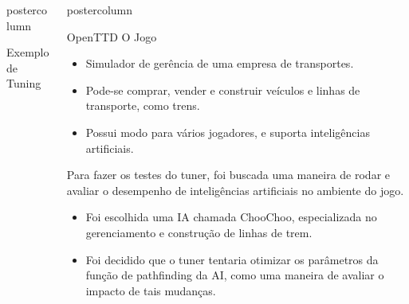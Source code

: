 \documentclass[final]{beamer}
\newlength{\columnheight}
\begin{document}
\begin{frame}
\begin{columns}
\begin{column}{.5\textwidth}
\begin{beamercolorbox}[center,wd=\textwidth]{postercolumn}
\begin{minipage}[T]{.95\textwidth}
{\begin{block}{Exemplo de Tuning}
            	\vspace*{0.2cm}
            \end{block}
          }
        \end{minipage}
      \end{beamercolorbox}
    \end{column}

    \begin{column}{.5\textwidth}
      \begin{beamercolorbox}[center,wd=\textwidth]{postercolumn}
        \begin{minipage}[T]{.95\textwidth} %
          \parbox[t][\columnheight]{\textwidth}{ %
            
            \vspace*{0.8cm}
            
            \begin{block}{OpenTTD}
                O Jogo
                \begin{itemize}
                  \item Simulador de gerência de uma empresa de transportes.
                  \item Pode-se comprar, vender e construir veículos e linhas de transporte, como trens.
                  \item Possui modo para vários jogadores, e suporta inteligências artificiais.
                \end{itemize}
                
                \vspace*{0.5cm}
                Para fazer os testes do tuner, foi buscada uma maneira de rodar e avaliar o desempenho de inteligências artificiais no ambiente do jogo.
                \begin{itemize}
                  \item Foi escolhida uma IA chamada ChooChoo, especializada no gerenciamento e construção de linhas de trem.
                  \item Foi decidido que o tuner tentaria otimizar os parâmetros da função de pathfinding da AI, como uma maneira de avaliar o impacto de tais mudanças.
                \end{itemize}  
                         

\end{block}}
\end{minipage}
\end{beamercolorbox}
\end{column}
\end{columns}
\end{frame}
\end{document}
